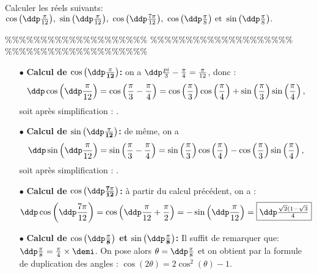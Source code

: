 



\begin{exercice}  \;
Calculer les r\'eels suivants: $\cos{\left(\ddp\frac{\pi}{12}\right)},\ \sin{\left(\ddp\frac{\pi}{12}\right)},\ \cos{\left(\ddp\frac{7\pi}{12}\right)},\ \cos{\left(\ddp\frac{\pi}{8}\right)}\ \hbox{et}\ \sin{\left(\ddp\frac{\pi}{8}\right)} .$
\end{exercice}


\%\%\%\%\%\%\%\%\%\%\%\%\%\%\%\%\%\%\%\%
\%\%\%\%\%\%\%\%\%\%\%\%\%\%\%\%\%\%\%\%
\%\%\%\%\%\%\%\%\%\%\%\%\%\%\%\%\%\%\%\%




\begin{correction}  \;
\begin{itemize}
\item[$\bullet$] \textbf{Calcul de $\mathbf{\cos{\left(\ddp\frac{\pi}{12}\right)}}$:} on a $\ddp \frac{pi}{3}-\frac{\pi}{4} = \frac{\pi}{12}$, donc :
$$\ddp \cos\left(\ddp\frac{\pi}{12}\right) = \cos\left(\frac{\pi}{3}-\frac{\pi}{4}\right) = \cos \left(\frac{\pi}{3}\right)\cos \left(\frac{\pi}{4}\right) + \sin \left(\frac{\pi}{3}\right)\sin \left(\frac{\pi}{4}\right),$$
soit apr\`es simplification : .
\item[$\bullet$] \textbf{Calcul de $\mathbf{\sin{\left(\ddp\frac{\pi}{12}\right)}}$:}  de m\^eme, on a 
$$\ddp \sin\left(\ddp\frac{\pi}{12}\right) = \sin\left(\frac{\pi}{3}-\frac{\pi}{4}\right) = \sin \left(\frac{\pi}{3}\right)\cos \left(\frac{\pi}{4}\right) - \cos \left(\frac{\pi}{3}\right)\sin \left(\frac{\pi}{4}\right),$$
soit apr\`es simplification : .
\item[$\bullet$] \textbf{Calcul de $\mathbf{\cos{\left(\ddp\frac{7\pi}{12}\right)}}$:} \`a partir du calcul pr\'ec\'edent, on a :
$$\ddp \cos{\left(\ddp\frac{7\pi}{12}\right)} = \cos{\left(\ddp\frac{\pi}{12}+\frac{\pi}{2}\right)} = -\sin{\left(\ddp\frac{\pi}{12}\right)} = \fbox{$\ddp \frac{\sqrt{2}(1-\sqrt{3}}{4}$}$$
\item[$\bullet$] \textbf{Calcul de $\mathbf{\cos{\left(\ddp\frac{\pi}{8}\right)}}$ et $\mathbf{\sin{\left(\ddp\frac{\pi}{8}\right)}}$:}  Il suffit de remarquer que: $\ddp\frac{\pi}{8}=\frac{\pi}{4}\times \demi$. On pose alors $\theta=\ddp\frac{\pi}{8}$ et on obtient par la formule de duplication des angles : $\cos{(2\theta)}=2\cos^2{(\theta)}-1.$

\end{itemize}
\end{correction}

